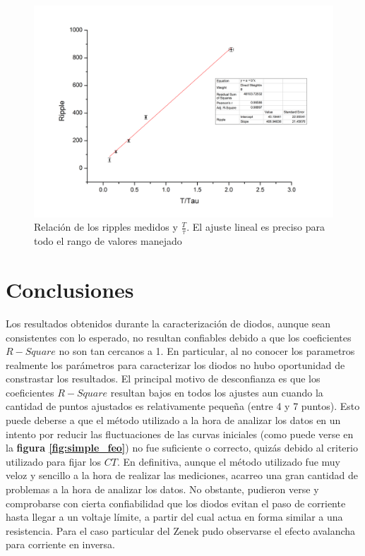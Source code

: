 \documentclass[11pt,a4paper]{article}
\begin{document}
\begin{figure}[h]
\centering
\includegraphics[scale=0.37]{completa_lineal}
   \caption{Relación de los ripples medidos y $\frac{T}{\tau}$. El ajuste lineal es preciso para todo el rango de valores manejado}
   \label{fig:completa_lineal}
\end{figure}


\section{Conclusiones}

Los resultados obtenidos durante la caracterización de diodos, aunque sean consistentes con lo esperado, no resultan confiables debido a que los coeficientes $R-Square$ no son tan cercanos a 1. En particular, al no conocer los parametros
realmente los parámetros para caracterizar los diodos no hubo oportunidad de constrastar los resultados. El principal motivo de desconfianza es que los coeficientes $R-Square$ resultan bajos en todos los ajustes aun cuando la cantidad
de puntos ajustados es relativamente pequeña (entre 4 y 7 puntos). Esto puede deberse a que el método utilizado a la hora de analizar los datos en un intento por reducir las fluctuaciones de las curvas iniciales (como puede verse en la 
\textbf{figura \ref{fig:simple_feo}}) no fue suficiente o correcto, quizás debido al criterio utilizado para fijar los $CT$. En definitiva, aunque el método utilizado fue muy veloz y sencillo a la hora de realizar las mediciones, acarreo
una gran cantidad de problemas a la hora de analizar los datos. No obstante, pudieron verse y comprobarse con cierta confiabilidad que los diodos evitan el paso de corriente hasta llegar a un voltaje límite, a partir del cual actua en
forma similar a una resistencia. Para el caso particular del Zenek pudo observarse el efecto avalancha para corriente en inversa.
\end{document}
